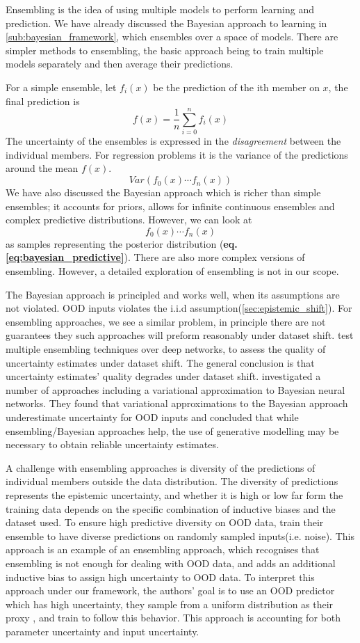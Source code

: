 \documentclass[../main.tex]{subfiles}
\begin{document}
Ensembling is the idea of using multiple models to perform learning and prediction. We have already discussed the Bayesian approach to learning in \cref{sub:bayesian_framework}, which ensembles over a space of models. There are simpler methods to ensembling, the basic approach being to train multiple models separately and then average their predictions.

For a simple ensemble, let $f_i(x)$ be the prediction of the ith member on $x$, the final prediction is 
$$f(x) = \frac{1}{n} \sum_{i=0}^n f_i(x)$$ 
The uncertainty of the ensembles is expressed in the \emph{disagreement} between the individual members. For regression problems it is the variance of the predictions around the mean $f(x)$. 
$$Var(f_0(x) \cdots f_n(x))$$
We have also discussed the Bayesian approach which is richer than simple ensembles; it accounts for priors, allows for infinite continuous ensembles and complex predictive distributions. However, we can look at $${f_0(x) \cdots f_n(x)}$$ as samples representing the posterior distribution (\textbf{eq.\ref{eq:bayesian_predictive}}).
There are also more complex versions of ensembling. However, a detailed exploration of ensembling is not in our scope. 

The Bayesian approach is principled and works well, when its assumptions are not violated. OOD inputs violates the i.i.d assumption(\cref{sec:epistemic_shift}). For ensembling approaches, we see a similar problem, in principle there are not guarantees they such approaches will preform reasonably under dataset shift. \citet{ovadia2019can} test multiple ensembling techniques over deep networks, to assess the quality of uncertainty estimates under dataset shift. The general conclusion is that uncertainty estimates' quality degrades under dataset shift. \citet{Mundt2019open} investigated a number of approaches including a variational approximation to Bayesian neural networks. They found that variational approximations to the Bayesian approach underestimate uncertainty for OOD inputs and concluded that while ensembling/Bayesian approaches help, the use of generative modelling may be necessary to obtain reliable uncertainty estimates.

A challenge with ensembling approaches is diversity of the predictions of individual members outside the data distribution. The diversity of predictions represents the epistemic uncertainty, and whether it is high or low far form the training data depends on the specific combination of inductive biases and the dataset used.  
To ensure high predictive diversity on OOD data, \citet{jain2019maximizing}  train their ensemble to have diverse predictions on randomly sampled inputs(i.e. noise). 
This approach is an example of an ensembling approach, which recognises that ensembling is not enough for dealing with OOD data, and adds an additional inductive bias to assign high uncertainty to OOD data. To interpret this approach under our framework, the authors' goal is to use an OOD predictor  which has high uncertainty, they
sample from a uniform distribution as their proxy , and train  to follow this behavior. This approach is accounting for both parameter uncertainty and input uncertainty.  
\end{document}
